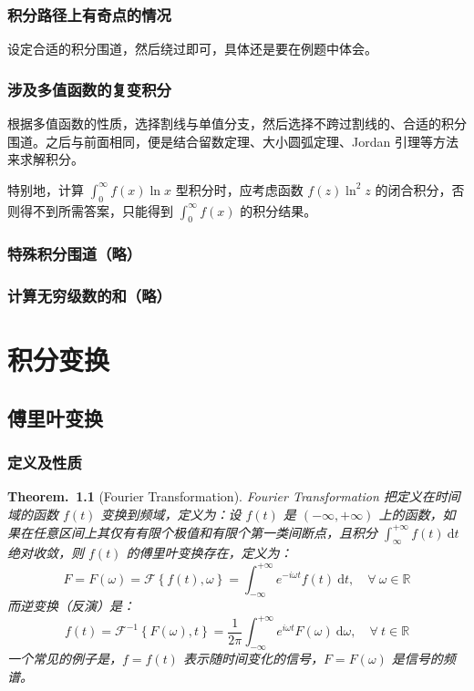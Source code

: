 \documentclass[UTF8]{report}
\def\R{\mathbb{R}}
\theoremstyle{MyLineTheoremStyle} %
\theoremstyle{MyBlockTheoremStyle} %
\newtheorem{BlockTheorem}[LineTheorem]{Theorem.\,} %
\theoremstyle{MySubsubsectionStyle} %
\begin{document}
\subsection{积分路径上有奇点的情况}

设定合适的积分围道，然后绕过即可，具体还是要在例题中体会。

\subsection{涉及多值函数的复变积分}

根据多值函数的性质，选择割线与单值分支，然后选择不跨过割线的、合适的积分围道。之后与前面相同，便是结合留数定理、大小圆弧定理、Jordan 引理等方法来求解积分。

特别地，计算 $\int_{0}^{\infty} f(x)\ln x$ 型积分时，应考虑函数 $f(z) \ln^2 z$ 的闭合积分，否则得不到所需答案，只能得到 $\int_{0}^{\infty} f(x)$ 的积分结果。

\subsection{特殊积分围道（略）}

\subsection{计算无穷级数的和（略）}

\chapter{积分变换}\thispagestyle{fancy}


\section{傅里叶变换}

\subsection{定义及性质}
\begin{BlockTheorem}[Fourier Transformation]\label{Fourier Transformation}
    Fourier Transformation 把定义在时间域的函数 $f(t)$ 变换到频域，定义为：设 $f(t)$ 是 $(-\infty, +\infty)$ 上的函数，如果在任意区间上其仅有有限个极值和有限个第一类间断点，且积分 $\int_{\infty}^{+\infty} f(t) \ \mathrm{d}t$ 绝对收敛，则 $f(t)$ 的傅里叶变换存在，定义为：
    \begin{equation}
        F = F(\omega) = \mathscr{F}\left\{ f(t), \omega \right\} = \int_{-\infty}^{+\infty} e^{-i\omega t}f(t) \ \mathrm{d}t,\quad \forall\ \omega \in \R
    \end{equation}
    而逆变换（反演）是：
\begin{equation}
    f(t) = \mathscr{F}^{-1}\left\{ F(\omega), t \right\} = \frac{1}{2\pi} \int_{-\infty}^{+\infty} e^{i\omega t}F(\omega) \ \mathrm{d}\omega,\quad \forall\ t \in \R
\end{equation}
一个常见的例子是，$f = f(t)$ 表示随时间变化的信号，$F = F(\omega)$ 是信号的频谱。
\end{BlockTheorem}
\end{document}
